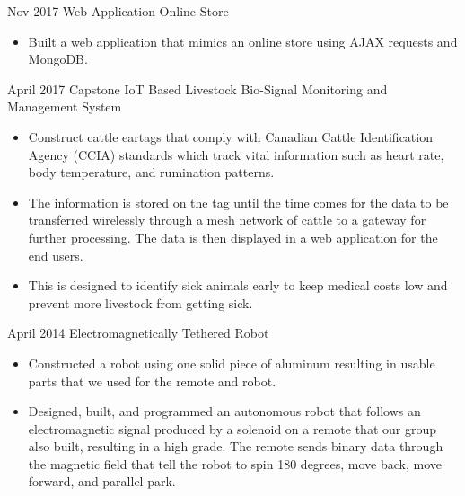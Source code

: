 \documentclass[]{friggeri-cv} %
\begin{document}
\begin{entrylist}

\entryFirstPage
{Nov 2017}
{Web Application {\normalfont Online Store}}
{
\begin{itemize}
\item Built a web application that mimics an online store using AJAX requests
and MongoDB.\\
\end{itemize}
}
\entryFirstPage
{April 2017}
{Capstone {\normalfont IoT Based Livestock Bio-Signal Monitoring and Management System}}
{
\begin{itemize}
\item Construct cattle eartags that comply with Canadian Cattle Identification
Agency (CCIA) standards which track vital information such as heart rate, body
temperature, and rumination patterns.
\item The information is stored on the tag until the time comes for the
data to be transferred wirelessly through a mesh network of cattle to a gateway
for further processing. The data is then displayed in a web application for the
end users.
\item This is designed to identify sick animals early to keep medical costs low
and prevent more livestock from getting sick.\\
\end{itemize}
}
\entryFirstPage
{April 2014}
{Electromagnetically Tethered Robot}
{
\begin{itemize}
\item Constructed a robot using one solid piece of aluminum resulting in usable
parts that we used for the remote and robot.
\item Designed, built, and programmed an autonomous robot that follows an
electromagnetic signal produced by a
solenoid on a remote that our group also built, resulting in a high grade. The
remote sends binary data through
the magnetic field that tell the robot to spin 180 degrees, move back, move
forward, and parallel park.
\end{itemize}
}
\end{entrylist}


\end{document}
